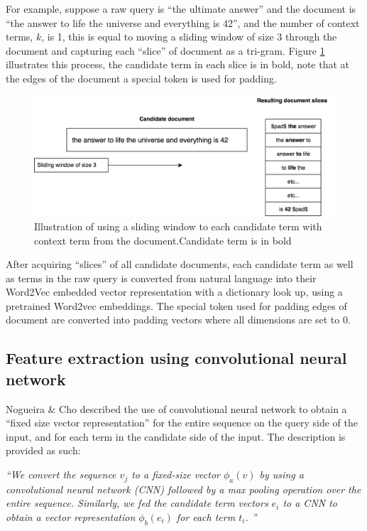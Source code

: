 For example, suppose a raw query is ``the ultimate answer'' and the document is ``the answer to life the universe and everything is 42'', and the number of context terms, $k$, is 1, this is equal to moving a sliding window of size 3 through the document and capturing each ``slice'' of document as a tri-gram.  Figure \ref{fig:chapter4-contextwindow} illustrates this process, the candidate term in each slice is in bold, note that at the edges of the document a special token is used for padding.

\begin{figure}[h]
	\centering
	\includegraphics[width=1\linewidth]{images/chapter_4/Chapter_4-context_window}
	\caption{Illustration of using a sliding window to each candidate term with context term from the document.Candidate term is in bold}
	\label{fig:chapter4-contextwindow}
\end{figure}


After acquiring ``slices'' of all candidate documents, each candidate term as well as terms in the raw query is converted from natural language into their Word2Vec embedded vector representation with a dictionary look up, using a pretrained Word2vec embeddings. The special token used for padding edges of document are converted into padding vectors where all dimensions are set to 0.



\subsection{Feature extraction using convolutional neural network}

Nogueira \& Cho \cite{nogueira2017task} described the use of convolutional neural network to obtain a “fixed size vector representation” for the entire sequence on the query side of the input, and for each term in the candidate side of the input. The description is provided as such: 

\textit{``We convert the sequence $v_j$ to a fixed-size vector $\phi_a(v)$ by using a convolutional neural network (CNN) followed by a max pooling operation over the entire sequence. Similarly, we fed the candidate term vectors $e_i$ to a CNN to obtain a vector representation $\phi_b (e_i)$ for each term $t_i$. ''}

